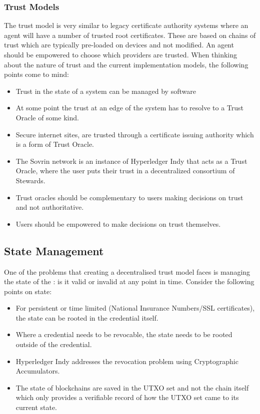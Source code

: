\documentclass[10pt,a4paper]{runcrypto}
\begin{document}
\subsubsection{Trust Models}
The trust model is very similar to legacy certificate authority systems where an agent will have a number of trusted root certificates. These are based on chains of trust which are typically pre-loaded on devices and not modified. An agent should be empowered to choose which providers are trusted.
When thinking about the nature of trust and the current implementation models, the following points come to mind:

\begin{itemize}
	\item Trust in the state of a system can be managed by software
	\item At some point the trust at an edge of the system has to resolve to a Trust Oracle of some kind.
	\item Secure internet sites, are trusted through a certificate issuing authority which is a form of Trust Oracle.
	\item The Sovrin network is an instance of Hyperledger Indy that acts as a Trust Oracle, where the user puts their trust in a decentralized consortium of Stewards.
	\item Trust oracles should be complementary to users making decisions on trust and not authoritative.
	\item Users should be empowered to make decisions on trust themselves.
\end{itemize}

\subsection{State Management}
One of the problems that creating a decentralised trust model faces is managing the state of the \diddoc: is it valid or invalid at any point in time. Consider the following points on state:

\begin{itemize}
	\item For persistent or time limited \diddoc (National Insurance Numbers/SSL certificates), the state can be rooted in the credential itself.
	\item Where a credential needs to be revocable, the state needs to be rooted outside of the credential.
	\item Hyperledger Indy addresses the revocation problem using Cryptographic Accumulators.
	\item The state of blockchains are saved in the UTXO set and not the chain itself which only provides a verifiable record of how the UTXO set came to its current state.
\end{itemize}
\end{document}
